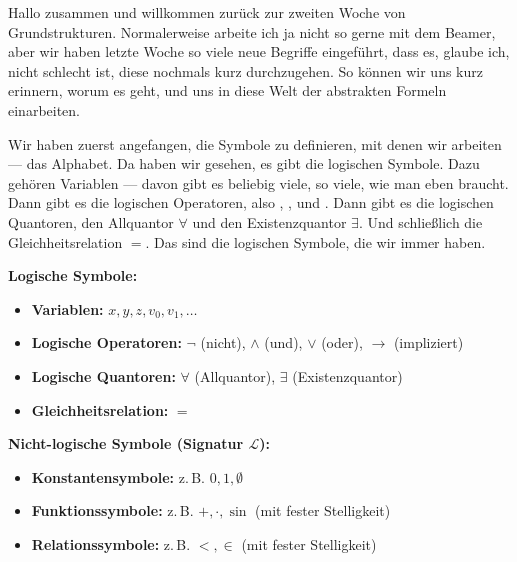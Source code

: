 \begin{spoken-clean}[00:00:00 - 00:02:15]
Hallo zusammen und willkommen zurück zur zweiten Woche von Grundstrukturen. Normalerweise arbeite ich ja nicht so gerne mit dem Beamer, aber wir haben letzte Woche so viele neue Begriffe eingeführt, dass es, glaube ich, nicht schlecht ist, diese nochmals kurz durchzugehen. So können wir uns kurz erinnern, worum es geht, und uns in diese Welt der abstrakten Formeln einarbeiten.

Wir haben zuerst angefangen, die Symbole zu definieren, mit denen wir arbeiten --- das Alphabet. Da haben wir gesehen, es gibt die logischen Symbole. Dazu gehören Variablen --- davon gibt es beliebig viele, so viele, wie man eben braucht. Dann gibt es die logischen Operatoren, also , ,  und . Dann gibt es die logischen Quantoren, den Allquantor $\forall$ und den Existenzquantor $\exists$. Und schließlich die Gleichheitsrelation $=$. Das sind die logischen Symbole, die wir immer haben.
\end{spoken-clean}

\begin{math-stroke}
\textbf{Logische Symbole:}
\begin{itemize}
    \item \textbf{Variablen:} $x, y, z, v_0, v_1, \dots$
    \item \textbf{Logische Operatoren:} $\neg$ (nicht), $\wedge$ (und), $\vee$ (oder), $\rightarrow$ (impliziert)
    \item \textbf{Logische Quantoren:} $\forall$ (Allquantor), $\exists$ (Existenzquantor)
    \item \textbf{Gleichheitsrelation:} $=$
\end{itemize}

\textbf{Nicht-logische Symbole (Signatur \texorpdfstring{$\mathcal{L}$}{L}):}
\begin{itemize}
    \item \textbf{Konstantensymbole:} z.\,B. $0, 1, \emptyset$
    \item \textbf{Funktionssymbole:} z.\,B. $+, \cdot, \sin$ (mit fester Stelligkeit)
    \item \textbf{Relationssymbole:} z.\,B. $<, \in$ (mit fester Stelligkeit)
\end{itemize}

\end{math-stroke}

